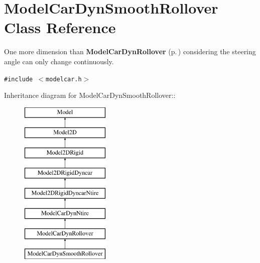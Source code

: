 \section{Model\-Car\-Dyn\-Smooth\-Rollover  Class Reference}
\label{classModelCarDynSmoothRollover}
One more dimension than {\bf Model\-Car\-Dyn\-Rollover} {\rm (p.\,\pageref{classModelCarDynRollover})} considering the steering angle can only change continuously. 


{\tt \#include $<$modelcar.h$>$}

Inheritance diagram for Model\-Car\-Dyn\-Smooth\-Rollover::\begin{figure}[H]
\begin{center}
\leavevmode
\includegraphics[height=8cm]{classModelCarDynSmoothRollover}
\end{center}
\end{figure}
